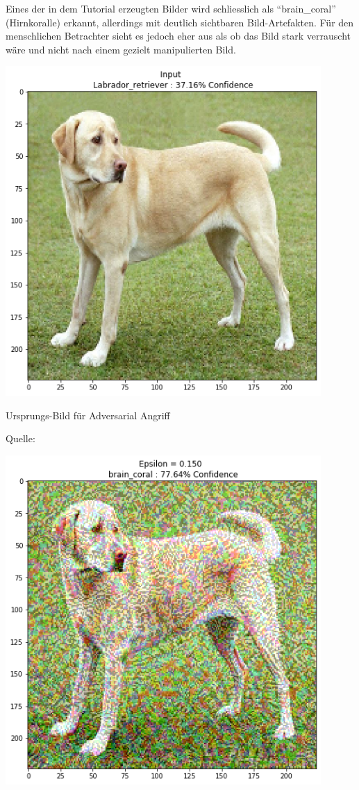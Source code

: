 \documentclass[
  12pt, %
  a4paper, %
  oneside, %
  openany, 
  numbers=noenddot, %
  BCOR=5mm, %
  parskip=half*, %
  thesis, %
]{bfhbook}
\begin{document}
Eines der in dem Tutorial erzeugten Bilder wird schliesslich als ``brain\_coral'' (Hirnkoralle) erkannt, allerdings mit deutlich sichtbaren Bild-Artefakten. Für den menschlichen Betrachter sieht es jedoch eher aus als ob das Bild stark verrauscht wäre und nicht nach einem gezielt manipulierten Bild.
\begin{center}
\begin{minipage}[t]{0.45\linewidth}
	\vspace{0pt}
	\centering
	\includegraphics[width=0.9\textwidth]{Bilder/tensorflow-adversarial-original.png}
	 \caption{Ursprungs-Bild für Adversarial Angriff}
	\caption*{Quelle: \parencite{tensorflowFGSM}}
\end{minipage}\hfill
\begin{minipage}[t]{0.45\linewidth}
	\vspace{0pt}
	\centering
	\includegraphics[width=0.9\textwidth]{Bilder/tensorflow-adversarial-fake.png}

\end{minipage}
\end{center}
\end{document}
